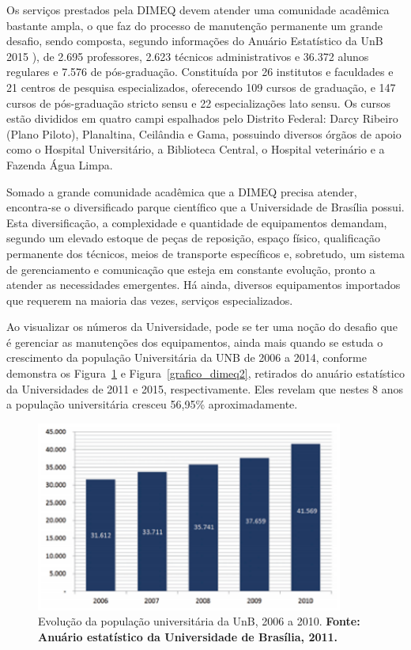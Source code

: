 Os serviços prestados pela DIMEQ devem atender uma comunidade acadêmica bastante ampla, o que faz do processo de manutenção permanente um grande desafio, sendo composta, segundo informações do Anuário Estatístico da UnB 2015 \cite{anuario2015}), de 2.695 professores, 2.623 técnicos administrativos e 36.372 alunos regulares e 7.576 de pós-graduação. Constituída por 26 institutos e faculdades e 21 centros de pesquisa especializados, oferecendo 109 cursos de graduação, e 147 cursos de pós-graduação stricto sensu e 22 especializações lato sensu. Os cursos estão divididos em quatro campi espalhados pelo Distrito Federal: Darcy Ribeiro (Plano Piloto), Planaltina, Ceilândia e Gama, possuindo diversos órgãos de apoio como o Hospital Universitário, a Biblioteca Central, o Hospital veterinário e a Fazenda Água Limpa.

Somado a grande comunidade acadêmica que a DIMEQ precisa atender, encontra-se o diversificado parque científico que a Universidade de Brasília possui. Esta diversificação, a complexidade e quantidade de equipamentos demandam, segundo \cite{limacastilho2006} um elevado estoque de peças de reposição, espaço físico, qualificação permanente dos técnicos, meios de transporte específicos e, sobretudo, um sistema de gerenciamento e comunicação que esteja em constante evolução, pronto a atender as necessidades emergentes. Há ainda, diversos equipamentos importados que requerem na maioria das vezes, serviços especializados.

Ao visualizar os números da Universidade, pode se ter uma noção do desafio que é gerenciar as manutenções dos equipamentos, ainda mais quando se estuda o crescimento da população Universitária da UNB de 2006 a 2014, conforme demonstra os Figura~\ref{grafico_dimeq1} e Figura~\ref{grafico_dimeq2}, retirados do anuário estatístico da Universidades de 2011 e 2015, respectivamente. Eles revelam que nestes 8 anos a população universitária cresceu 56,95\% aproximadamente.

\graphicspath{{figuras/}}
\begin{figure}[H]
\centering
\includegraphics[width=0.9\textwidth]{grafico_dimeq1}
\caption{Evolução da população universitária da UnB, 2006 a 2010. \textbf{Fonte: Anuário estatístico da Universidade de Brasília, 2011.}}
\label{grafico_dimeq1}
\end{figure}


